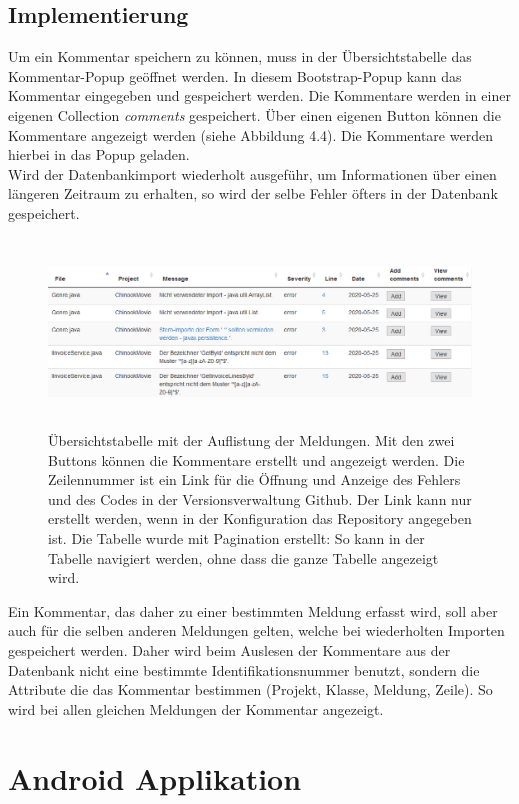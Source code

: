 \subsection{Implementierung}
Um ein Kommentar speichern zu können, muss in der Übersichtstabelle das Kommentar-Popup geöffnet werden. In diesem Bootstrap-Popup kann das Kommentar eingegeben und gespeichert werden. Die Kommentare werden in einer eigenen Collection \textit{comments} gespeichert. Über einen eigenen Button können die Kommentare angezeigt werden (siehe Abbildung 4.4). Die Kommentare werden hierbei in das Popup geladen. \\ Wird der Datenbankimport wiederholt ausgeführ, um Informationen über einen längeren Zeitraum zu erhalten, so wird der selbe Fehler öfters in der Datenbank gespeichert.
\begin{figure}[tp]
  \centering
  \includegraphics[height=5cm]{images/table.PNG}
 \caption[Übersichtstabelle]{Übersichtstabelle mit der Auflistung der Meldungen. Mit den zwei Buttons können die Kommentare erstellt und angezeigt werden. Die Zeilennummer ist ein Link für die Öffnung und Anzeige des Fehlers und des Codes in der Versionsverwaltung Github. Der Link kann nur erstellt werden, wenn in der Konfiguration das Repository angegeben ist. Die Tabelle wurde mit Pagination erstellt: So kann in der Tabelle navigiert werden, ohne dass die ganze Tabelle angezeigt wird. }
  \label{fig:popup}
\end{figure}
Ein Kommentar, das daher zu einer bestimmten Meldung erfasst wird, soll aber auch für die selben anderen Meldungen gelten, welche bei wiederholten Importen gespeichert werden. Daher wird beim Auslesen der Kommentare aus der Datenbank nicht eine bestimmte Identifikationsnummer benutzt, sondern die Attribute die das Kommentar bestimmen (Projekt, Klasse, Meldung, Zeile). So wird bei allen gleichen Meldungen der Kommentar angezeigt.
\section{Android Applikation}
